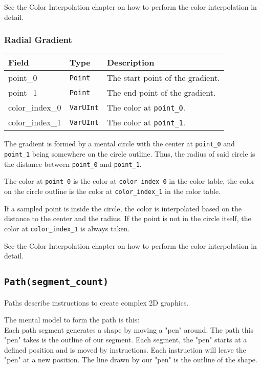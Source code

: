 \documentclass[]{article}
\begin{document}
See the \hypertarget{color-interpolation}{Color Interpolation} chapter on how to perform the color interpolation in detail.

\hypertarget{radial-gradient}{\subsubsection{Radial Gradient}\label{radial-gradient}}

\begin{longtable}[]{@{}p{1in}p{1in}p{4in}@{}}
\toprule
Field & Type & Description \\
\midrule
\endhead
point\_0        & \texttt{Point}   & The start point of the gradient. \\
point\_1        & \texttt{Point}   & The end point of the gradient. \\
color\_index\_0 & \texttt{VarUInt} & The color at \texttt{point\_0}. \\
color\_index\_1 & \texttt{VarUInt} & The color at \texttt{point\_1}. \\
\bottomrule
\end{longtable}

The gradient is formed by a mental circle with the center at
\texttt{point\_0} and \texttt{point\_1} being somewhere on the circle
outline. Thus, the radius of said circle is the distance between
\texttt{point\_0} and \texttt{point\_1}.

The color at \texttt{point\_0} is the color at \texttt{color\_index\_0}
in the color table, the color on the circle outline is the color at
\texttt{color\_index\_1} in the color table.

If a sampled point is inside the circle, the color is interpolated based
on the distance to the center and the radius. If the point is
not in the circle itself, the color at \texttt{color\_index\_1} is
always taken.

See the \hypertarget{color-interpolation}{Color Interpolation} chapter on how to perform the color interpolation in detail.

\hypertarget{pathsegment_count}{\subsection{\texorpdfstring{\texttt{Path(segment\_count)}}{Path(segment\_count)}}\label{pathsegment_count}}

Paths describe instructions to create complex 2D graphics.

The mental model to form the path is this:\\
Each path segment generates a shape by moving a "pen" around. The path
this "pen" takes is the outline of our segment. Each segment, the "pen"
starts at a defined position and is moved by instructions. Each
instruction will leave the "pen" at a new position. The line drawn by
our "pen" is the outline of the shape.
\end{document}

